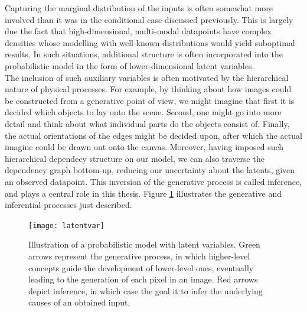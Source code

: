 \documentclass{report}
\begin{document}
\noindent Capturing the marginal distribution of the inputs is often somewhat more involved than it was in the conditional case discussed previously. This is largely due the fact that high-dimensional, multi-modal datapoints have complex densities whose modelling with well-known distributions would yield suboptimal results. In such situations, additional structure is often incorporated into the probabilistic model in the form of lower-dimensional latent variables. \\

\noindent The inclusion of such auxiliary variables is often motivated by the hierarchical nature of physical processes. For example, by thinking about how images could be constructed from a generative point of view, we might imagine that first it is decided which objects to lay onto the scene. Second, one might go into more detail and think about what individual parts do the objects consist of. Finally, the actual orientations of the edges might be decided upon, after which the actual imagine could be drawn out onto the canvas. Moreover, having imposed such hierarchical dependecy structure on our model, we can also traverse the dependency graph bottom-up, reducing our uncertainty about the latents, given an observed datapoint. This inversion of the generative process is called inference, and plays a central role in this thesis. Figure \ref{fig:latent-vars} illustrates the generative and inferential processes just described. \\

\begin{figure}
\begin{center}
\texttt{[image: latentvar]}
\caption{Illustration of a probabilistic model with latent variables. Green arrows represent the generative process, in which higher-level concepts guide the development of lower-level ones, eventually leading to the generation of each pixel in an image. Red arrows depict inference, in which case the goal it to infer the underlying causes of an obtained input.}
\label{fig:latent-vars}
\end{center}
\end{figure}
\end{document}

